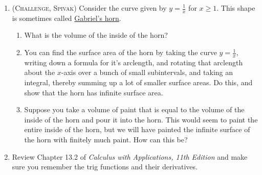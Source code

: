 \begin{enumerate}
    \item 
        (\textsc{Challenge, Spivak})
        Consider the curve given by $y = \frac{1}{x}$ for $x \geq 1$.
        This shape is sometimes called 
        \href{https://en.wikipedia.org/wiki/Gabriel's_Horn}{Gabriel's horn}.
        \begin{enumerate}
        \item What is the volume of the inside of the horn?
        \item You can find the surface area of the horn 
            by taking the curve $y = \frac{1}{x}$,
            writing down a formula for it's arclength, 
            and rotating that arclength about the $x$-axis
            over a bunch of small subintervals,
            and taking an integral, 
            thereby summing up a lot of smaller surface areas.
            Do this, and show that the horn has infinite surface area.
        \item Suppose you take a volume of paint that is equal to 
            the volume of the inside of the horn and pour it into the horn.
            This would seem to paint the entire inside of the horn,
            but we will have painted the infinite surface of the horn
            with finitely much paint. How can this be?
        \end{enumerate}

    \item %
        Review Chapter 13.2 of \emph{Calculus with Applications, 11th Edition}
        and make sure you remember the trig functions
        and their derivatives.


\end{enumerate}
